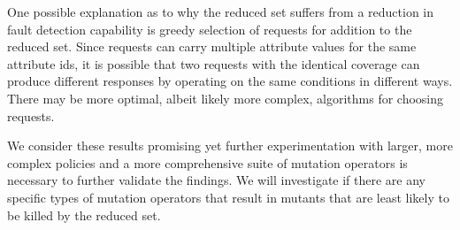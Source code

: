 {One possible explanation as to why the reduced set suffers from a
reduction in fault detection capability is greedy selection of
requests for addition to the reduced set.  Since requests can
carry multiple attribute values for the same attribute ids, it is
possible that two requests with the identical coverage can produce
different responses by operating on the same conditions in
different ways. There may be more optimal, albeit likely more
complex, algorithms for choosing requests.

We consider these results promising yet further experimentation with
larger, more complex policies and a more comprehensive suite of
mutation operators is necessary to further validate the findings.
We will investigate if there are any specific types of mutation
operators that result in mutants that are least likely to be killed
by the reduced set. }

